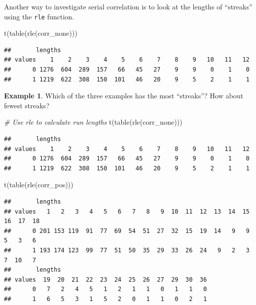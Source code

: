 \documentclass[
  11pt,
]{book}
\newenvironment{Shaded}{\begin{snugshade}}{\end{snugshade}}
\newcommand{\CommentTok}[1]{\textcolor[rgb]{0.56,0.35,0.01}{\textit{#1}}}
\newcommand{\FunctionTok}[1]{\textcolor[rgb]{0.00,0.00,0.00}{#1}}
\newcommand{\NormalTok}[1]{#1}
\theoremstyle{definition}
\theoremstyle{definition}
\newtheorem{example}{Example}[chapter]
\theoremstyle{definition}
\theoremstyle{definition}
\theoremstyle{remark}
\begin{document}
Another way to investigate serial correlation is to look at the lengths of ``streaks'' using the \texttt{rle} function.

\begin{Shaded}
\begin{Highlighting}[]
\FunctionTok{t}\NormalTok{(}\FunctionTok{table}\NormalTok{(}\FunctionTok{rle}\NormalTok{(corr\_none)))}
\end{Highlighting}
\end{Shaded}

\begin{verbatim}
##       lengths
## values    1    2    3    4    5    6    7    8    9   10   11   12
##      0 1276  604  289  157   66   45   27    9    9    0    1    0
##      1 1219  622  308  150  101   46   20    9    5    2    1    1
\end{verbatim}

\smallskip

\begin{example}
Which of the three examples has the most ``streaks''? How about fewest streaks?
\end{example}

\begin{Shaded}
\begin{Highlighting}[]
\CommentTok{\# Use rle to calculate run lengths}
\FunctionTok{t}\NormalTok{(}\FunctionTok{table}\NormalTok{(}\FunctionTok{rle}\NormalTok{(corr\_none)))}
\end{Highlighting}
\end{Shaded}

\begin{verbatim}
##       lengths
## values    1    2    3    4    5    6    7    8    9   10   11   12
##      0 1276  604  289  157   66   45   27    9    9    0    1    0
##      1 1219  622  308  150  101   46   20    9    5    2    1    1
\end{verbatim}

\begin{Shaded}
\begin{Highlighting}[]
\FunctionTok{t}\NormalTok{(}\FunctionTok{table}\NormalTok{(}\FunctionTok{rle}\NormalTok{(corr\_pos)))}
\end{Highlighting}
\end{Shaded}

\begin{verbatim}
##       lengths
## values   1   2   3   4   5   6   7   8   9  10  11  12  13  14  15  16  17  18
##      0 201 153 119  91  77  69  54  51  27  32  15  19  14   9   9   5   3   6
##      1 193 174 123  99  77  51  50  35  29  33  26  24   9   2   3   7  10   7
##       lengths
## values  19  20  21  22  23  24  25  26  27  29  30  36
##      0   7   2   4   5   1   2   1   1   0   1   1   0
##      1   6   5   3   1   5   2   0   1   1   0   2   1
\end{verbatim}
\end{document}

